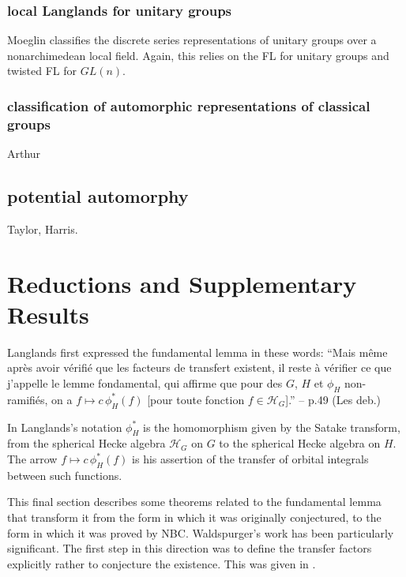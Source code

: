 \documentclass[brochure,english,12pt]{bourbaki}
\begin{document}
\subsubsection{local Langlands for unitary groups}

Moeglin classifies the discrete series representations of unitary
groups over a nonarchimedean local field.  Again, this relies on the
FL for unitary groups and twisted FL for $GL(n)$.


\subsubsection{classification of automorphic representations of classical groups}

Arthur

\subsection{potential automorphy}

Taylor, Harris.






\section{Reductions and Supplementary Results}

Langlands first expressed the fundamental lemma in these words:
``Mais m\^eme apr\`es avoir
v\'erifi\'e que les facteurs de
transfert existent, il reste \`a v\'erifier ce que j'appelle le
lemme fondamental, qui affirme que pour des $G$, $H$ et $\phi_H$
non-ramifi\'es, on a $f\mapsto c\, \phi_H^*(f)$ [pour toute fonction $f\in {\mathcal H}_G$].''
 -- p.49 (Les deb.)  \cite[p.49]{Debuts}

In Langlands's notation $\phi_H^*$ is the homomorphism given by the
Satake transform, from the spherical Hecke algebra ${\mathcal H}_G$ on
$G$ to the spherical Hecke algebra on $H$.  The arrow $f\mapsto
c\,\phi_H^*(f)$ is his assertion of the transfer of orbital integrals
between such functions.

This final section describes some theorems related to the fundamental
lemma that transform it from the form in which it was originally
conjectured, to the form in which it was proved by NBC.  Waldspurger's
work has been particularly significant.  The first step in this
direction was to define the transfer factors explicitly rather to
conjecture the existence.  This was given in \cite{LS}.
\end{document}
